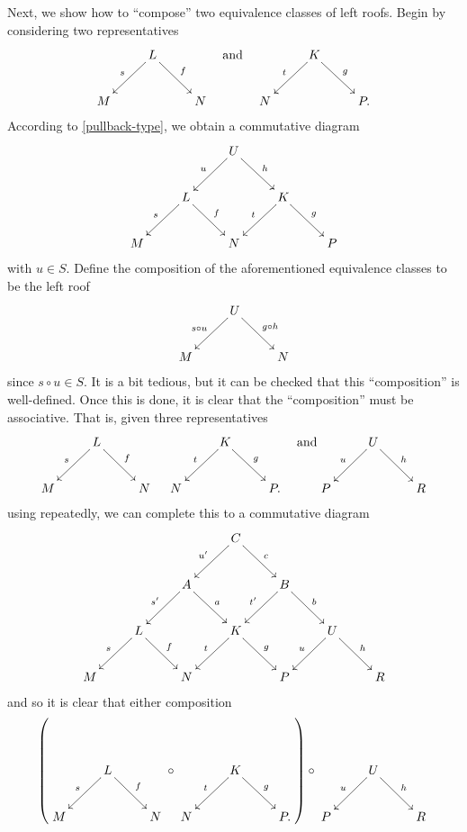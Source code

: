 \documentclass[11pt]{article}
\theoremstyle{thmstyle}
\theoremstyle{defstyle}
\begin{document}
Next, we show how to ``compose'' two equivalence classes of left roofs. Begin by considering two representatives 
\begin{equation*}
	\xymatrix {
		& L\ar[ld]_s\ar[rd]^f & \\
		M & & N
	}
	\quad\text{and}\quad 
	\xymatrix {
		& K\ar[ld]_t\ar[rd]^g & \\
		N & & P.
	}
\end{equation*}
According to \ref{pullback-type}, we obtain a commutative diagram 
\begin{equation*}
	\xymatrix {
		& & U\ar[ld]_u\ar[rd]^h & & \\
		& L\ar[ld]_s\ar[rd]^f & & K\ar[ld]_t\ar[rd]^g & \\
		M & & N & & P
	}
\end{equation*}
with $u\in S$. Define the composition of the aforementioned equivalence classes to be the left roof 
\begin{equation*}
	\xymatrix {
		& U\ar[ld]_{s\circ u}\ar[rd]^{g\circ h} & \\
		M & & N
	}
\end{equation*}
since $s\circ u\in S$. It is a bit tedious, but it can be checked that this ``composition'' is well-defined. Once this is done, it is clear that the ``composition'' must be associative. That is, given three representatives 
\begin{equation*}
	\xymatrix {
		& L\ar[ld]_s\ar[rd]^f & \\
		M & & N
	}
	\quad
	\xymatrix {
		& K\ar[ld]_t\ar[rd]^g & \\
		N & & P.
	}
	\quad\text{and}
	\xymatrix { 
		& U\ar[ld]_u\ar[rd]^h &\\
		P & & R
	}
\end{equation*}
using  repeatedly, we can complete this to a commutative diagram
\begin{equation*}
	\xymatrix {
		& & & C\ar[ld]_{u'}\ar[rd]^c & & &\\
		& & A\ar[ld]_{s'}\ar[rd]^{a} & & B\ar[ld]_{t'}\ar[rd]^b & & \\
		& L\ar[ld]_s\ar[rd]^f & & K\ar[ld]_t\ar[rd]^g & & U\ar[ld]_u\ar[rd]^h & \\
		M & & N & & P & & R
	}
\end{equation*}
and so it is clear that either composition 
\begin{equation*}
	\left(
	\xymatrix {
		& L\ar[ld]_s\ar[rd]^f & \\
		M & & N
	}
	\circ
	\xymatrix {
		& K\ar[ld]_t\ar[rd]^g & \\
		N & & P.
	}
	\right)
	\circ
	\xymatrix { 
		& U\ar[ld]_u\ar[rd]^h &\\
		P & & R
	}
\end{equation*}
\end{document}
